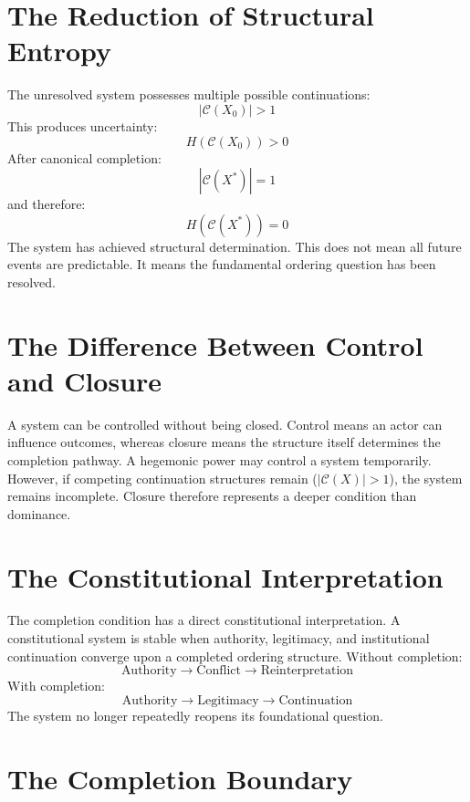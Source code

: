 \documentclass[11pt,openany]{book}
\theoremstyle{plain}
\theoremstyle{definition}
\begin{document}
\section{The Reduction of Structural Entropy}

The unresolved system possesses multiple possible continuations:
\[
|\mathcal{C}(X_0)| > 1
\]
This produces uncertainty:
\[
H(\mathcal{C}(X_0)) > 0
\]
After canonical completion:
\[
|\mathcal{C}(X^*)| = 1
\]
and therefore:
\[
H(\mathcal{C}(X^*)) = 0
\]
The system has achieved structural determination. This does not mean all future events are predictable. It means the fundamental ordering question has been resolved.

\section{The Difference Between Control and Closure}

A system can be controlled without being closed. Control means an actor can influence outcomes, whereas closure means the structure itself determines the completion pathway. A hegemonic power may control a system temporarily. However, if competing continuation structures remain (\(|\mathcal{C}(X)| > 1\)), the system remains incomplete. Closure therefore represents a deeper condition than dominance.

\section{The Constitutional Interpretation}

The completion condition has a direct constitutional interpretation. A constitutional system is stable when authority, legitimacy, and institutional continuation converge upon a completed ordering structure. Without completion:
\[
\text{Authority} \longrightarrow \text{Conflict} \longrightarrow \text{Reinterpretation}
\]
With completion:
\[
\text{Authority} \longrightarrow \text{Legitimacy} \longrightarrow \text{Continuation}
\]
The system no longer repeatedly reopens its foundational question.

\section{The Completion Boundary}
\end{document}
